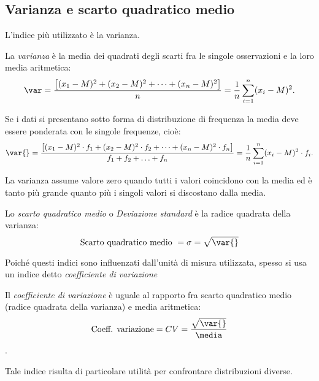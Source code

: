 
\subsection{Varianza e scarto quadratico medio}
\label{subsec:stat02_scarto_quadratico}

L'indice più utilizzato è la varianza.

\begin{definizione}
La \emph{varianza} è la media dei quadrati degli scarti fra le singole 
osservazioni e la loro media aritmetica:
\[\var=\frac{ \left[ (x_1-M)^2+(x_2-M)^2+ \cdots +(x_n-M)^2 \right] 
}{n}=\frac{1}{n}\sum_{i=1}^n (x_i-M)^2.\]
\end{definizione}

Se i dati si presentano sotto forma di distribuzione di frequenza la media 
deve essere ponderata con le singole
frequenze, cioè:
\begin{equation*}
\var{}=\frac{\left[(x_1-M)^2\cdot f_1+(x_2-M)^2\cdot f_2+ \cdots 
+(x_n-M)^2\cdot f_n \right]}{f_1+f_2+\ldots+f_n}=\frac 
{1}{n}\sum_{i=1}^n(x_i-M)^2\cdot f_i.
\end{equation*}

La varianza assume valore zero quando tutti i valori coincidono con la 
media ed è tanto più grande quanto più i singoli valori
si discostano dalla media. 

\begin{definizione}
Lo \emph{scarto quadratico medio} o \emph{Deviazione standard} è la radice 
quadrata della varianza:
\[\text{Scarto quadratico medio } = \sigma = \sqrt{\var{}}\]
\end{definizione}

Poiché questi indici sono influenzati dall'unità di misura utilizzata, 
spesso si usa un indice detto \emph{coefficiente di variazione}

\begin{definizione}
Il \emph{coefficiente di variazione} è uguale al rapporto fra scarto 
quadratico medio (radice quadrata
della varianza) e media aritmetica:
\[\text{Coeff. variazione} = CV = \frac{\sqrt{\var{}}}{\media}\].
\end{definizione}
Tale indice risulta di particolare utilità per confrontare distribuzioni 
diverse.

